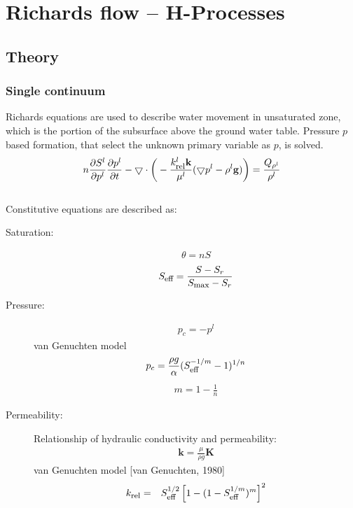 \chapter{Richards flow -- H-Processes}
\label{sec:Richards}
\section{Theory}
\subsection{Single continuum}
Richards equations are used to describe water movement in
unsaturated zone, which is the portion of the subsurface above the
ground water table. Pressure $p$ based formation, that select the
unknown primary variable as $p$, is solved.\\
\begin{eqnarray}\label{eqn:pbased}
n\frac{\partial S^l}{\partial p^l}\frac{\partial p^l}{\partial
t}-\bigtriangledown\cdot\bigg(-\frac{k_{\mbox{\footnotesize rel}}
^l\mathbf{k}}{\mu^l}(\bigtriangledown
p^l-\rho^l\mathbf{g})\bigg)=\frac{Q_{\rho^l}} {\rho^l}
\end{eqnarray}\\

Constitutive equations are described as:
\begin{description}
  \item[Saturation:]
    \begin{eqnarray}
    \theta = n S
    \end{eqnarray}
    \begin{eqnarray}
     S_{\mbox{\footnotesize eff}}=\frac{S-S_r}{S_{\mbox{\footnotesize max}}-S_r}
    \end{eqnarray}
  \item[Pressure:]
    \begin{eqnarray}
    p_c = -p^l
    \end{eqnarray}
    van Genuchten model
    \begin{eqnarray}
    p_c = \frac{\rho g}{\alpha}(S_{\mbox{\footnotesize eff}}^{-1/m}-1)^{1/n}
    \end{eqnarray}
    \begin{eqnarray}
    m=1-\frac{1}{n}
    \end{eqnarray}
  \item[Permeability:] Relationship of hydraulic conductivity and
  permeability:
    \begin{eqnarray}
    \mathbf{k}=\frac{\mu}{\rho g}\mathbf{K}
    \end{eqnarray}
    van Genuchten model [van Genuchten, 1980]
    \begin{eqnarray}
    k_{\mbox{\footnotesize rel}} &=& S_{\mbox{\footnotesize eff}}^{1/2} \left[
            1-(1-S_{\mbox{\footnotesize eff}}^{1/m})^m \right]^2
    \end{eqnarray}
\end{description}

